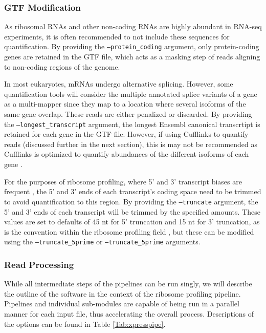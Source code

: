 \documentclass[11pt, a4paper, oneside]{article}
\begin{document}
\subsubsection{GTF Modification}
As ribosomal RNAs and other non-coding RNAs are highly abundant in RNA-seq experiments, it is often recommended to not include these sequences for quantification. By providing the \texttt{--protein\_coding} argument, only protein-coding genes are retained in the GTF file, which acts as a masking step of reads aligning to non-coding regions of the genome. \par

In most eukaryotes, mRNAs undergo alternative splicing. However, some quantification tools will consider the multiple annotated splice variants of a gene as a multi-mapper since they map to a location where several isoforms of the same gene overlap. These reads are either penalized or discarded. By providing the \texttt{--longest\_transcript} argument, the longest Ensembl canonical transcrtipt \cite{ensembl_canon} is retained for each gene in the GTF file. However, if using Cufflinks to quantify reads (discussed further in the next section), this is may not be recommended as Cufflinks is optimized to quantify abundances of the different isoforms of each gene \cite{cufflinks}. \par

For the purposes of ribosome profiling, where 5' and 3' transcript biases are frequent \cite{ingolia_meth, weinberg_reports}, the 5' and 3' ends of each transcript's coding space need to be trimmed to avoid quantification to this region. By providing the \texttt{--truncate} argument, the 5' and 3' ends of each transcript will be trimmed by the specified amounts. These values are set to defaults of 45 nt for 5' truncation and 15 nt for 3' truncation, as is the convention within the ribosome profiling field \cite{ingolia_meth}, but these can be modified using the \texttt{--truncate\_5prime} or \texttt{--truncate\_5prime} arguments.

\subsubsection{Read Processing}
While all intermediate steps of the pipelines can be run singly, we will describe the outline of the software in the context of the ribosome profiling pipeline. Pipelines and individual sub-modules are capable of being run in a parallel manner for each input file, thus accelerating the overall process. Descriptions of the options can be found in Table \ref{Tab:xpresspipe}.
\end{document}
